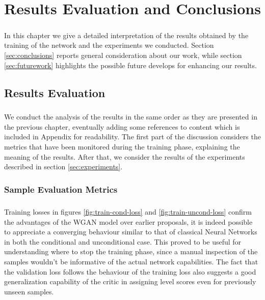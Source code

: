 \chapter{Results Evaluation and Conclusions}
\paragraph{} In this chapter we give a detailed interpretation of the results obtained by the training of the network and the experiments we conducted. Section \ref{sec:conclusions} reports general consideration about our work, while section \ref{sec:futurework} highlights the possible future develops for enhancing our results.

\section{Results Evaluation}

\paragraph{} We conduct the analysis of the results in the same order as they are presented in the previous chapter, eventually adding some references to content which is included in Appendix for readability. The first part of the discussion considers the metrics that have been monitored during the training phase, explaining the meaning of the results. After that, we consider the results of the experiments described in section \ref{sec:experiments}.
\subsection{Sample Evaluation Metrics}
\paragraph{} Training losses in figures \ref{fig:train-cond-loss} and \ref{fig:train-uncond-loss} confirm the advantages of the WGAN model over earlier proposals, it is indeed possible to appreciate a converging behaviour similar to that of classical Neural Networks in both the conditional and unconditional case. This proved to be useful for understanding where to stop the training phase, since a manual inspection of the samples wouldn't be informative of the actual network capabilities. The fact that the validation loss follows the behaviour of the training loss also suggests a good generalization capability of the critic in assigning level scores even for previously unseen samples. 

